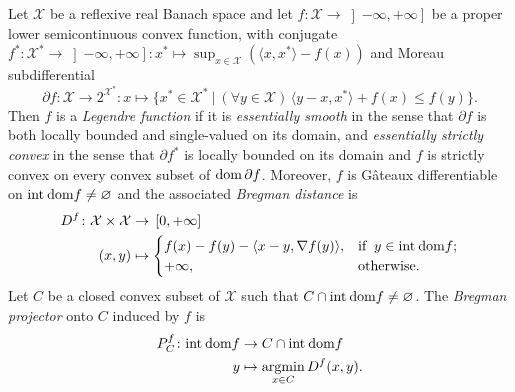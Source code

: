 \documentclass[a4paper,11pt,fleqn]{article}
\renewcommand{\leq}{\ensuremath{\leqslant}}
\newcommand{\pair}[2]{\langle{{#1},{#2}}\rangle}
\newcommand{\menge}[2]{\big\{{#1}~\big |~{#2}\big\}}
\newcommand{\IDD}{\ensuremath{\text{\rm int\:dom}f}}
\newcommand{\RX}{\ensuremath{\left]-\infty,+\infty\right]}}
\newcommand{\XX}{\ensuremath{{\mathcal X}}}
\newcommand{\emp}{\ensuremath{{\varnothing}}}
\newcommand{\pinf}{\ensuremath{{+\infty}}}
\newcommand{\dom}{\ensuremath{\text{\rm dom}\,}}
\theoremstyle{plain}{\theorembodyfont{\rmfamily}%
\newtheorem{conjecture}[theorem]{Conjecture}}
\theoremstyle{plain}{\theorembodyfont{\rmfamily}%
\newtheorem{example}[theorem]{Example}}
\theoremstyle{plain}{\theorembodyfont{\rmfamily}%
\newtheorem{remark}[theorem]{Remark}}
\theoremstyle{plain}{\theorembodyfont{\rmfamily}%
\newtheorem{algorithm}[theorem]{Algorithm}}
\theoremstyle{plain}{\theorembodyfont{\rmfamily}%
\newtheorem{condition}[theorem]{Condition}}
\theoremstyle{plain}{\theorembodyfont{\rmfamily}%
\newtheorem{definition}[theorem]{Definition}}
\theoremstyle{plain}{\theorembodyfont{\rmfamily}
\newtheorem{problem}[theorem]{Problem}}
\theoremstyle{plain}{\theorembodyfont{\rmfamily}
\newtheorem{notation}[theorem]{Notation}}
\numberwithin{equation}{section}
\begin{document}
\begin{definition}{\rm\cite{Ccm01,Sico03}}
Let $\XX$ be a reflexive real Banach space and let 
$f\colon\XX\to\RX$ be a proper lower semicontinuous convex function,
with conjugate $f^*\colon\XX^*\to\RX\colon
x^*\mapsto\sup_{x\in\XX}(\pair{x}{x^*}-f(x))$ and 
Moreau subdifferential \cite{Mor63c}
\begin{equation}
\label{e:subdiff}
\partial f\colon\XX\to 2^{\XX^*}\colon x\mapsto
\menge{x^*\in\XX^*}{(\forall y\in\XX)\,
\pair{y-x}{x^*}+f(x)\leq f(y)}.  
\end{equation}
Then $f$ is a \emph{Legendre function} if it is 
\emph{essentially smooth} in the sense that $\partial f$ is 
both locally bounded and single-valued on its
domain, and \emph{essentially strictly convex} in the sense
that $\partial f^*$ is locally bounded on its domain and 
$f$ is strictly convex on every convex subset of $\dom\partial f$.
Moreover, $f$ is G\^ateaux differentiable on $\IDD\neq\emp$
and the associated \emph{Bregman distance} is 
\begin{equation}
\label{e:Bdist}
\begin{aligned}
D^f\colon\XX\times\XX&\to\,[0,\pinf]\\
(x,y)&\mapsto 
\begin{cases}
f(x)-f(y)-\pair{x-y}{\nabla f(y)},&\text{if}\;\;y\in\IDD;\\
\pinf,&\text{otherwise}.
\end{cases}
\end{aligned}
\end{equation}
Let $C$ be a closed convex subset of $\XX$ such that
$C\cap\IDD\neq\emp$. The \emph{Bregman projector} onto $C$ induced
by $f$ is 
\begin{equation}
\label{e:2001}
\begin{aligned}
P^f_C\colon\IDD&\to C\cap\IDD\\
y&\mapsto\underset{x\in C}{\text{argmin}}\,D^f(x,y).
\end{aligned}
\end{equation}
\end{definition}
\end{document}

